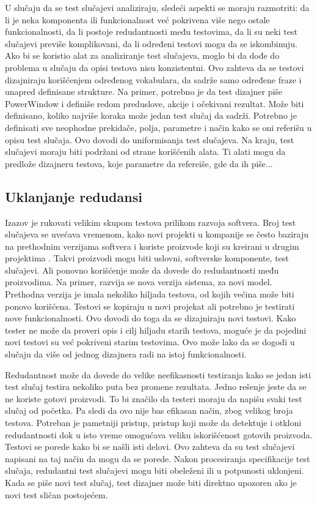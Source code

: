 \documentclass[a4paper]{article}
\begin{document}
U slučaju da se test slučajevi analiziraju, sledeći aspekti se moraju razmotriti: da li je neka komponenta ili funkcionalnost već pokrivena više nego ostale funkcionalnosti, da li postoje redudantnosti među testovima, da li su neki test slučajevi previše komplikovani, da li određeni testovi mogu da se iskombinuju. Ako bi se koristio alat za analiziranje test slučajeva, moglo bi da dođe do problema u slučaju da opisi testova nisu konzistentni. Ovo zahteva da se testovi dizajniraju korišćenjem određenog vokabulara, da sadrže samo određene fraze i unapred definisane strukture. Na primer, potrebno je da test dizajner piše PowerWindow i definiše redom preduslove, akcije i očekivani rezultat. Može biti definisano, koliko najviše koraka može jedan test slučaj da sadrži. Potrebno je definisati sve neophodne prekidače, polja, parametre i način kako se oni referišu u opisu test slučaja. Ovo dovodi do uniformisanja test slučajeva. Na kraju, test slučajevi moraju biti podržani od strane korišćenih alata. Ti alati mogu da predlože dizajneru testova, koje parametre da refereiše, gde da ih piše...
\bigbreak

\subsection{Uklanjanje redudansi}
\label{subsec:redundansi}

Izazov je rukovati velikim skupom testova prilikom razvoja softvera. Broj test slučajeva se uvećava vremenom, kako novi projekti u kompanije se često baziraju na prethodnim verzijama softvera i koriste proizvode koji su kreirani u drugim projektima \cite{ref18}. Takvi proizvodi mogu biti uslovni, softverske komponente, test slučajevi. Ali ponovno korišćenje može da dovede do redudantnosti među proizvodima. Na primer, razvija se nova verzija sistema, za novi model. Prethodna verzija je imala nekoliko hiljada testova, od kojih većina može biti ponovo korišćena. Testovi se kopiraju u novi projekat ali potrebno je testirati nove funkcionalnosti. Ovo dovodi do toga da se dizajniraju novi testovi. Kako tester ne može da proveri opis i cilj hiljadu starih testova, moguće je da pojedini novi testovi su već pokriveni starim testovima. Ovo može lako da se dogodi u slučaju da više od jednog dizajnera radi na istoj funkcionalnosti.
\bigbreak

Redudantnost može da dovede do velike neefikasnosti testiranja kako se jedan isti test slučaj testira nekoliko puta bez promene rezultata. Jedno rešenje jeste da se ne koriste gotovi proizvodi. To bi značilo da testeri moraju da napišu svaki test slučaj od početka. Pa sledi da ovo nije bas efikasan način, zbog velikog broja testova. Potreban je pametniji pristup, pristup koji može da detektuje i otkloni redudantnosti dok u isto vreme omogućava veliku iskorišćenost gotovih proizvoda. Testovi se porede kako bi se našli isti delovi. Ovo zahteva da su test slučajevi napisani na taj način da mogu da se porede. Nakon procesiranja specifikacije test slučaja, redudantni test slučajevi mogu biti obeleženi ili u potpunosti uklonjeni. Kada se piše novi test slučaj, test dizajner može biti direktno upozoren ako je novi test sličan postojećem. 
\bigbreak
\end{document}
